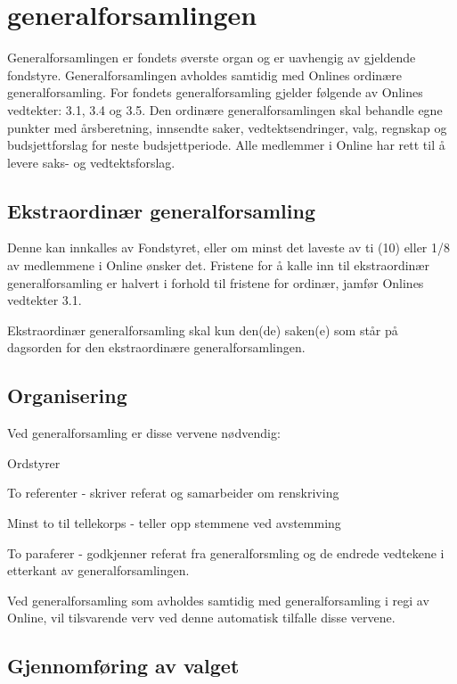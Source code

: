 \chapter{generalforsamlingen}

Generalforsamlingen er fondets øverste organ og er uavhengig av gjeldende fondstyre. Generalforsamlingen avholdes samtidig med Onlines ordinære generalforsamling. For fondets generalforsamling gjelder følgende av Onlines vedtekter: 3.1, 3.4 og 3.5.
Den ordinære generalforsamlingen skal behandle egne punkter med årsberetning, innsendte saker, vedtektsendringer, valg, regnskap og budsjettforslag for neste budsjettperiode.
Alle medlemmer i Online har rett til å levere saks- og vedtektsforslag.

\section{Ekstraordinær generalforsamling}


Denne kan innkalles av Fondstyret, eller om minst det laveste av ti (10) eller 1/8 av medlemmene i Online ønsker det. Fristene for å kalle inn til ekstraordinær generalforsamling er halvert i forhold til fristene for ordinær, jamfør Onlines vedtekter 3.1.

Ekstraordinær generalforsamling skal kun den(de) saken(e) som står på dagsorden for den ekstraordinære generalforsamlingen.


\section{Organisering}


Ved generalforsamling er disse vervene nødvendig:
\begin{liste}
  \item Ordstyrer
  \item To referenter - skriver referat og samarbeider om renskriving
  \item Minst to til tellekorps - teller opp stemmene ved avstemming
  \item To paraferer - godkjenner referat fra generalforsmling og de endrede vedtekene i etterkant av generalforsamlingen.
\end{liste}

Ved generalforsamling som avholdes samtidig med generalforsamling i regi av Online, vil tilsvarende verv ved denne automatisk tilfalle disse vervene.

\section{Gjennomføring av valget}


